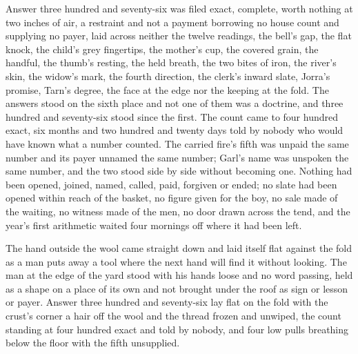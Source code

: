 Answer three hundred and seventy-six was filed exact, complete, worth nothing at two inches of air, a restraint and not a payment borrowing no house count and supplying no payer, laid across neither the twelve readings, the bell's gap, the flat knock, the child's grey fingertips, the mother's cup, the covered grain, the handful, the thumb's resting, the held breath, the two bites of iron, the river's skin, the widow's mark, the fourth direction, the clerk's inward slate, Jorra's promise, Tarn's degree, the face at the edge nor the keeping at the fold. The answers stood on the sixth place and not one of them was a doctrine, and three hundred and seventy-six stood since the first. The count came to four hundred exact, six months and two hundred and twenty days told by nobody who would have known what a number counted. The carried fire's fifth was unpaid the same number and its payer unnamed the same number; Garl's name was unspoken the same number, and the two stood side by side without becoming one. Nothing had been opened, joined, named, called, paid, forgiven or ended; no slate had been opened within reach of the basket, no figure given for the boy, no sale made of the waiting, no witness made of the men, no door drawn across the tend, and the year's first arithmetic waited four mornings off where it had been left.

The hand outside the wool came straight down and laid itself flat against the fold as a man puts away a tool where the next hand will find it without looking. The man at the edge of the yard stood with his hands loose and no word passing, held as a shape on a place of its own and not brought under the roof as sign or lesson or payer. Answer three hundred and seventy-six lay flat on the fold with the crust's corner a hair off the wool and the thread frozen and unwiped, the count standing at four hundred exact and told by nobody, and four low pulls breathing below the floor with the fifth unsupplied.
